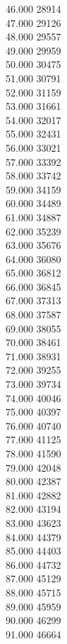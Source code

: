 { 46.000	28914 \\
 47.000	29126 \\
 48.000	29557 \\
 49.000	29959 \\
 50.000	30475 \\
 51.000	30791 \\
 52.000	31159 \\
 53.000	31661 \\
 54.000	32017 \\
 55.000	32431 \\
 56.000	33021 \\
 57.000	33392 \\
 58.000	33742 \\
 59.000	34159 \\
 60.000	34489 \\
 61.000	34887 \\
 62.000	35239 \\
 63.000	35676 \\
 64.000	36080 \\
 65.000	36812 \\
 66.000	36845 \\
 67.000	37313 \\
 68.000	37587 \\
 69.000	38055 \\
 70.000	38461 \\
 71.000	38931 \\
 72.000	39255 \\
 73.000	39734 \\
 74.000	40046 \\
 75.000	40397 \\
 76.000	40740 \\
 77.000	41125 \\
 78.000	41590 \\
 79.000	42048 \\
 80.000	42387 \\
 81.000	42882 \\
 82.000	43194 \\
 83.000	43623 \\
 84.000	44379 \\
 85.000	44403 \\
 86.000	44732 \\
 87.000	45129 \\
 88.000	45715 \\
 89.000	45959 \\
 90.000	46299 \\
 91.000	46664 \\
}
